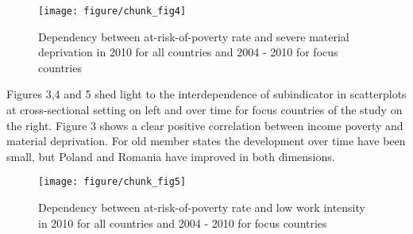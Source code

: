 \documentclass[11pt, a4paper]{article}\usepackage{graphicx, color}
\makeatletter
\def\maxwidth{ %
  \ifdim\Gin@nat@width>\linewidth
    \linewidth
  \else
    \Gin@nat@width
  \fi
}
\newenvironment{knitrout}{}{} %
\makeatother
\begin{document}

\begin{knitrout}
\color{fgcolor}\begin{figure}[H]
\texttt{[image: figure/chunk\_fig4]} \caption[Dependency between at-risk-of-poverty rate and severe material deprivation in 2010 for all countries and 2004 - 2010 for focus countries]{Dependency between at-risk-of-poverty rate and severe material deprivation in 2010 for all countries and 2004 - 2010 for focus countries\label{fig:chunk_fig4}}
\end{figure}

\end{knitrout}




Figures 3,4 and 5 shed light to the interdependence of subindicator in scatterplots at cross-sectional setting on left and over time for focus countries of the study on the right. Figure 3 shows a clear positive correlation between income poverty and material deprivation. For old member states the development over time have been small, but Poland and Romania have improved in both dimensions.



\begin{knitrout}
\color{fgcolor}\begin{figure}[H]
\texttt{[image: figure/chunk\_fig5]} \caption[Dependency between at-risk-of-poverty rate and low work intensity in 2010 for all countries and 2004 - 2010 for focus countries]{Dependency between at-risk-of-poverty rate and low work intensity in 2010 for all countries and 2004 - 2010 for focus countries\label{fig:chunk_fig5}}
\end{figure}

\end{knitrout}


\end{document}
